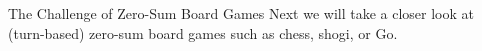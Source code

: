 \begin{frame}[t]{The Challenge of Zero-Sum Board Games}
    Next we will take a closer look at (turn-based) zero-sum board games such as chess, shogi, or Go.



\end{frame}
